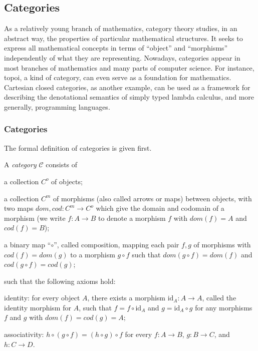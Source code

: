 \clearpage
\subsection{Categories}
\label{sec:bg_cat}
As a relatively young branch of mathematics, category theory studies, in an abstract way, the properties of particular mathematical structures. It seeks to express all mathematical concepts in terms of ``object'' and ``morphisms'' independently of what they are representing. Nowadays, categories appear in most branches of mathematics and many parts of computer science. For instance, topoi, a kind of category, can even serve as a foundation for mathematics. Cartesian closed categories, as another example, can be used as a framework for describing the denotational semantics of simply typed lambda calculus, and more generally, programming languages.


\subsubsection{Categories}
\label{sec:bg_cat_c}
The formal definition of categories is given first.
\begin{definition}
\label{definition:category}
A \emph{category} $ \mathcal{C} $ consists of
\begin{myitemize}
\item a collection $ C^o $ of objects;
\item a collection $ C^m $ of morphisms (also called arrows or maps) between objects, with two maps $ dom, cod : C^m \to C^o $ which give the domain and codomain of a morphism (we write $ f : A \to B $ to denote a morphism $ f $ with $ dom(f) = A $ and $ cod(f) = B $);
\item a binary map ``$ \circ $'', called composition, mapping each pair $ f, g $ of morphisms with $ cod(f) = dom(g) $ to a morphism $ g \circ f $ such that $ dom(g \circ f) = dom(f) $ and $ cod(g \circ f) = cod(g) $;
\end{myitemize}
such that the following axioms hold:
\begin{myitemize}
\item identity: for every object $ A $, there exists a morphism $ \text{id}_A : A \to A $, called the identity morphism for $ A $, such that $ f = f \circ \text{id}_A $ and $ g = \text{id}_A \circ g $ for any morphisms $ f $ and $ g $ with $ dom(f) = cod(g) = A $;
\item associativity: $ h \circ (g \circ f) = (h \circ g) \circ f $ for every $ f: A \to B $, $ g: B \to C$, and $ h: C \to D $.
\end{myitemize}
\end{definition}

